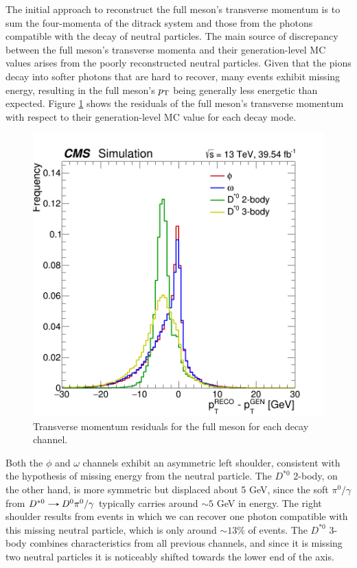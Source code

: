 \begin{myitemlist}
    The initial approach to reconstruct the full meson's transverse momentum is to sum the four-momenta of the ditrack system and those from the photons compatible with the decay of neutral particles. The main source of discrepancy between the full meson's transverse momenta and their generation-level MC values arises from the poorly reconstructed neutral particles. Given that the pions decay into softer photons that are hard to recover, many events exhibit missing energy, resulting in the full meson's $p_\text{T}$ being generally less energetic than expected. Figure \ref{fig:fullmeson_residuals_pt} shows the residuals of the full meson's transverse momentum with respect to their generation-level MC value for each decay mode.
    \begin{figure}[!ht]
        \captionsetup[subfigure]{labelformat=empty}
        \vspace*{-0.2cm}
        \centering
        \setlength{\mylength}{\textwidth}
        \includegraphics[width=0.75\mylength]{resources/plots/fullmeson_residuals_pt.png}
        \caption{Transverse momentum residuals for the full meson for each decay channel.}
        \label{fig:fullmeson_residuals_pt}
        \vspace*{-0.0cm}
    \end{figure}
    Both the $\phi$ and $\omega$ channels exhibit an asymmetric left shoulder, consistent with the hypothesis of missing energy from the neutral particle. The $D^{*0}$ 2-body, on the other hand, is more symmetric but displaced about 5 GeV, since the soft $\pi^{0}/\gamma$ from $D^{*0}\decaysto D^{0}\pi^{0}/\gamma$ typically carries around $\sim5$ GeV in energy. The right shoulder results from events in which we can recover one photon compatible with this missing neutral particle, which is only around $\sim 13\%$ of events. The $D^{*0}$ 3-body combines characteristics from all previous channels, and since it is missing two neutral particles it is noticeably shifted towards the lower end of the axis.


\end{myitemlist}
